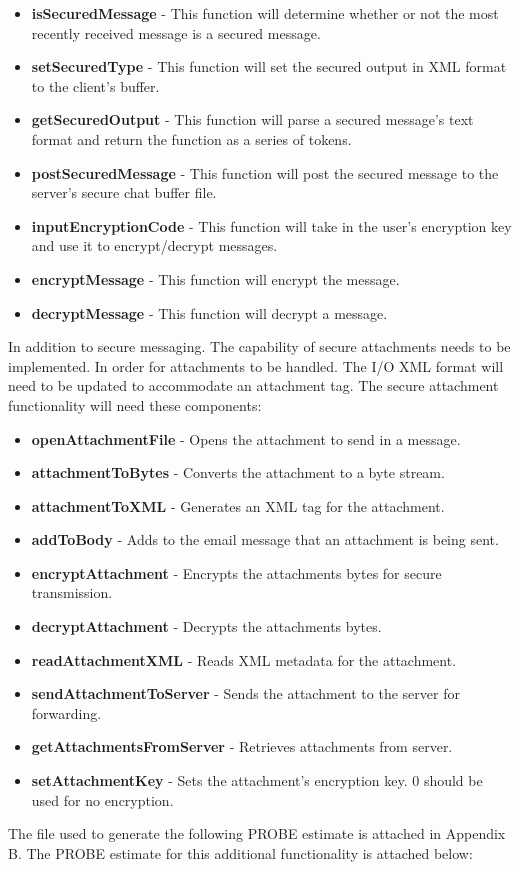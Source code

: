 \documentclass[11pt, letterpaper]{report}
\begin{document}
\begin{description}
\begin{itemize}
\item \textbf{isSecuredMessage} - This function will determine whether or not the most recently received message is a secured message.
\item \textbf{setSecuredType} - This function will set the secured output in XML format to the client's buffer.
\item \textbf{getSecuredOutput} - This function will parse a secured message's text format and return the function as a series of tokens.
\item \textbf{postSecuredMessage} - This function will post the secured message to the server's secure chat buffer file.
\item \textbf{inputEncryptionCode} - This function will take in the user's encryption key and use it to encrypt/decrypt messages.
\item \textbf{encryptMessage} - This function will encrypt the message.
\item \textbf{decryptMessage} - This function will decrypt a message.
\end{itemize} \newpage
In addition to secure messaging. The capability of secure attachments needs to be implemented. In order for attachments to be handled. The I/O XML format will need to be updated to accommodate an attachment tag. The secure attachment functionality will need these components:
\begin{itemize}
\item \textbf{openAttachmentFile} - Opens the attachment to send in a message.
\item \textbf{attachmentToBytes} - Converts the attachment to a byte stream.
\item \textbf{attachmentToXML} - Generates an XML tag for the attachment.
\item \textbf{addToBody} - Adds to the email message that an attachment is being sent.
\item \textbf{encryptAttachment} - Encrypts the attachments bytes for secure transmission.
\item \textbf{decryptAttachment} - Decrypts the attachments bytes.
\item \textbf{readAttachmentXML} - Reads XML metadata for the attachment.
\item \textbf{sendAttachmentToServer} - Sends the attachment to the server for forwarding.
\item \textbf{getAttachmentsFromServer} - Retrieves attachments from server.
\item \textbf{setAttachmentKey} - Sets the attachment's encryption key. 0 should be used for no encryption. 
\end{itemize}
The file used to generate the following PROBE estimate is attached in Appendix B. The PROBE estimate for this additional functionality is attached below:
\newpage

\newpage



\end{description}
\end{document}

